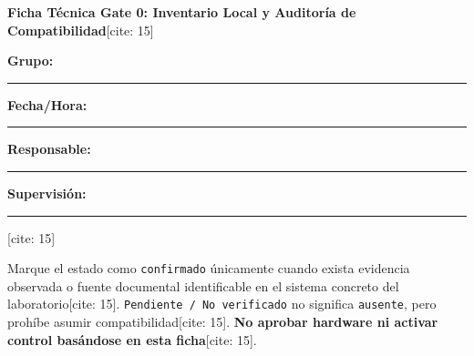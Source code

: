 \documentclass[10pt, a4paper, landscape]{article}
\begin{document}
\begin{center}
    \Large\textbf{\textcolor{ucbblue}{Ficha Técnica Gate 0: Inventario Local y Auditoría de Compatibilidad}}[cite: 15]
\end{center}

\vspace{0.2cm}
\noindent
\textbf{Grupo:} \rule{3.5cm}{0.15mm} \hfill
\textbf{Fecha/Hora:} \rule{4cm}{0.15mm} \hfill
\textbf{Responsable:} \rule{5cm}{0.15mm} \hfill
\textbf{Supervisión:} \rule{4.5cm}{0.15mm}[cite: 15]

\vspace{0.2cm}
\begin{tcolorbox}[colback=yellow!10, colframe=black, title=\textbf{Regla Epistémica de Auditoría Gate 0} {[cite: 15]}, left=2mm, right=2mm, top=1mm, bottom=1mm]
    \footnotesize
    Marque el estado como \texttt{confirmado} únicamente cuando exista evidencia observada o fuente documental identificable en el sistema concreto del laboratorio[cite: 15]. \texttt{Pendiente / No verificado} no significa \texttt{ausente}, pero prohíbe asumir compatibilidad[cite: 15]. \textbf{No aprobar hardware ni activar control basándose en esta ficha}[cite: 15].
\end{tcolorbox}
\end{document}

